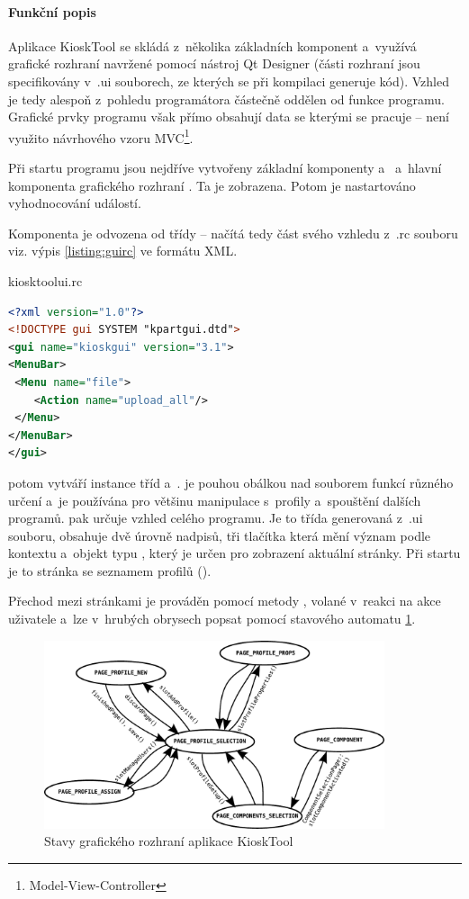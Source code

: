 \paragraph{Funkční popis}
Aplikace KioskTool se skládá z~několika základních komponent a~využívá grafické rozhraní navržené pomocí nástroj Qt Designer (části rozhraní jsou specifikovány v~.ui souborech, ze kterých se při kompilaci generuje kód). Vzhled je tedy alespoň z~pohledu programátora  částečně oddělen od funkce programu. Grafické prvky programu však přímo obsahují data se kterými se pracuje -- není využito návrhového vzoru MVC\footnote{Model-View-Controller}.

Při startu programu jsou nejdříve vytvořeny základní komponenty  a~ a~hlavní komponenta grafického rozhraní . Ta je zobrazena. Potom je nastartováno vyhodnocování událostí.

Komponenta  je odvozena od třídy  -- načítá tedy část svého vzhledu z~.rc souboru viz. výpis  \ref{listing:guirc} ve formátu XML.
\begin{mylisting}
\caption{kiosktoolui.rc}
\label{listing:guirc}
\begin{lstlisting}[language=XML]
<?xml version="1.0"?>
<!DOCTYPE gui SYSTEM "kpartgui.dtd">
<gui name="kioskgui" version="3.1">
<MenuBar>
 <Menu name="file">
    <Action name="upload_all"/>
 </Menu>
</MenuBar>
</gui>
\end{lstlisting}
\end{mylisting}

 potom vytváří instance tříd  a~.  je pouhou obálkou nad souborem funkcí různého určení a~je používána pro většinu manipulace s~profily a~spouštění dalších programů.  pak určuje vzhled celého programu. Je to třída generovaná z~.ui souboru, obsahuje dvě úrovně nadpisů, tři tlačítka která mění význam podle kontextu a~objekt typu , který je určen pro zobrazení aktuální stránky. Při startu je to stránka se seznamem profilů ().

Přechod mezi stránkami je prováděn pomocí metody , volané v~reakci na akce uživatele a~lze v~hrubých obrysech popsat pomocí stavového automatu \ref{fig:kioskstates}.

\begin{figure}[h]
    \centering
    \includegraphics[width=10cm]{obrazky/stated.pdf}
    \caption{Stavy grafického rozhraní aplikace KioskTool}
    \label{fig:kioskstates}
\end{figure}

